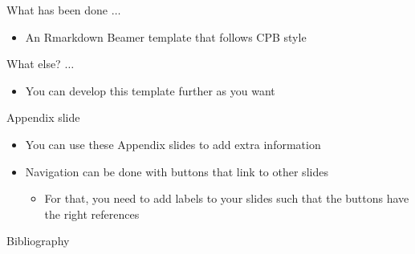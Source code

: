 \documentclass[aspectratio=169,11pt,handout,xcolor=dvipsnames]{beamer}
\providecommand{\tightlist}{}
\begin{document}
\begin{frame}{}
\label{closing-remarks}
\begin{block}{What has been done \(\ldots\)}
\begin{itemize}
\tightlist
\item
  An Rmarkdown Beamer template that follows CPB style
\end{itemize}
\end{block}

\pause

\begin{block}{What else? \(\ldots\)}
\begin{itemize}
\tightlist
\item
  You can develop this template further as you want
\end{itemize}
\end{block}
\end{frame}

\cpbeindframe

\begin{frame}[noframenumbering]{Appendix slide}
\label{appendix:01}
\begin{itemize}
\tightlist
\item
  You can use these Appendix slides to add extra information
\item
  Navigation can be done with buttons that link to other slides
  \begin{itemize}
  \tightlist
  \item
    For that, you need to add labels to your slides such that the buttons have the right references
  \end{itemize}
\end{itemize}

\end{frame}

\begin{frame}[noframenumbering,allowframebreaks=0.75]{Bibliography}
\label{bibliography}


\end{frame}
\end{document}

